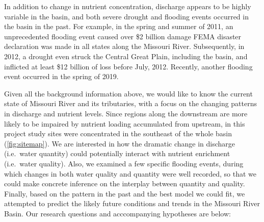 \documentclass[12pt,]{article}
\begin{document}
In addition to change in nutrient concentration, discharge appears to be
highly variable in the basin, and both severe drought and flooding
events occurred in the basin in the past. For example, in the spring and
summer of 2011, an unprecedented flooding event caused over \$2 billion
damage FEMA disaster declaration was made in all states along the
Missouri River. Subsequently, in 2012, a drought even struck the Central
Great Plain, including the basin, and inflicted at least \$12 billion of
loss before July, 2012. Recently, another flooding event occurred in the
spring of 2019.

Given all the background information above, we would like to know the
current state of Missouri River and its tributaries, with a focus on the
changing patterns in discharge and nutrient levels. Since regions along
the downstream are more likely to be impaired by nutrient loading
accumulated from upstream, in this project study sites were concentrated
in the southeast of the whole basin (\autoref{fig:sitemap}). We are
interested in how the dramatic change in discharge (i.e.~water quantity)
could potentially interact with nutrient enrichment (i.e.~water
quality). Also, we examined a few specific flooding events, during which
changes in both water quality and quantity were well recorded, so that
we could make concrete inference on the interplay between quantity and
quality. Finally, based on the pattern in the past and the best model we
could fit, we attempted to predict the likely future conditions and
trends in the Missouri River Basin. Our research questions and
acccompanying hypotheses are below:
\end{document}
